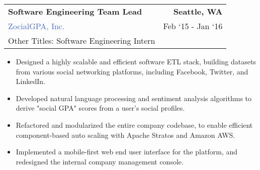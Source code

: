 \documentclass[10pt]{article}
\newcommand{\highlightcolor}{RoyalBlue}
\newcommand{\tabularxwidth}{\textwidth}
\begin{document}
    \begin{minipage}{\tabularxwidth}

        \begin{tabularx}{\tabularxwidth}{X r}
            \textbf{Software Engineering Team Lead} & \textbf{Seattle, 
        WA} \\
            \textcolor{\highlightcolor}{ZocialGPA, Inc.} & 
        
    Feb ‘15 - 
    Jan ‘16 \\
            
            
                Other Titles: Software Engineering Intern & \\
            
        \end{tabularx}

        \begin{itemize}[noitemsep, topsep=3pt, parsep=0pt, partopsep=0pt]
            
                \item 
    Designed a highly scalable and efficient software ETL stack, building datasets from various social networking platforms, including Facebook, Twitter, and LinkedIn.
            
                \item 
    Developed natural language processing and sentiment analysis algorithms to derive "social GPA" scores from a user's social profiles.
            
                \item 
    Refactored and modularized the entire company codebase, to enable efficient component-based auto scaling with Apache Stratos and Amazon AWS.
            
                \item 
    Implemented a mobile-first web end user interface for the platform, and redesigned the internal company management console.
            
        \end{itemize}

        
            \vspace{.5em}
        

    \end{minipage}
    
\end{document}
